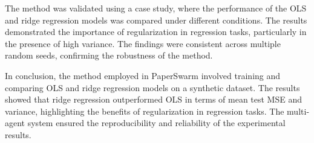 The method was validated using a case study, where the performance of the OLS and ridge regression models was compared under different conditions. The results demonstrated the importance of regularization in regression tasks, particularly in the presence of high variance. The findings were consistent across multiple random seeds, confirming the robustness of the method.

In conclusion, the method employed in PaperSwarm involved training and comparing OLS and ridge regression models on a synthetic dataset. The results showed that ridge regression outperformed OLS in terms of mean test MSE and variance, highlighting the benefits of regularization in regression tasks. The multi-agent system ensured the reproducibility and reliability of the experimental results.
